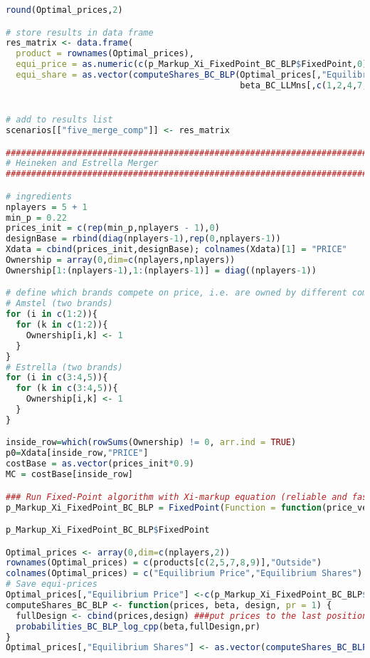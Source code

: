 \begin{lstlisting}[language=R,caption={Computing dynamic Nash equilibria in different competitive scenarios via the fixed point algorithm}, label=lst_nash_esti]
round(Optimal_prices,2)

# store results in data frame
res_matrix <- data.frame(
  product = rownames(Optimal_prices),
  equi_price = as.numeric(c(p_Markup_Xi_FixedPoint_BC_BLP$FixedPoint,0)),
  equi_share = as.vector(computeShares_BC_BLP(Optimal_prices[,"Equilibrium Price"],
                                              beta_BC_LLMns[,c(1,2,4,7,9,10,11)],designBase,pr=1)))


# add to results list
scenarios[["five_merge_comp"]] <- res_matrix

###########################################################################
# Heineken and Estrella Merger
###########################################################################

# ingredients
nplayers = 5 + 1 
min_p = 0.22
prices_init = c(rep(min_p,nplayers - 1),0)
designBase = rbind(diag(nplayers-1),rep(0,nplayers-1))
Xdata = cbind(prices_init,designBase); colnames(Xdata)[1] = "PRICE" 
Ownership = array(0,dim=c(nplayers,nplayers))
Ownership[1:(nplayers-1),1:(nplayers-1)] = diag((nplayers-1))

# define which brands compete on price, i.e. are owned by different companies
# Amstel (two brands)
for (i in c(1:2)){
  for (k in c(1:2)){
    Ownership[i,k] <- 1
  }
}
# Estrella (two brands)
for (i in c(3:4,5)){
  for (k in c(3:4,5)){
    Ownership[i,k] <- 1
  }
}

inside_row=which(rowSums(Ownership) != 0, arr.ind = TRUE)
p0=Xdata[inside_row,"PRICE"]
costBase = as.vector(prices_init*0.9)
MC = costBase[inside_row]

### Run Fixed-Point algorithm with Xi-markup equation (reliable and fast: See Table 3 in paper for comparison)
p_Markup_Xi_FixedPoint_BC_BLP = FixedPoint(Function = function(price_vec) FixedPoint_BLP_Xi(price_vec,MC=MC, ownership=Ownership,Xdata=Xdata,beta_draws=beta_BC_LLMns[,(c(1,2,4,7,9,10,11))],pr=1), Inputs = p0, MaxIter = 10000, ConvergenceMetricThreshold = 1e-10, Method = "Anderson")

p_Markup_Xi_FixedPoint_BC_BLP$FixedPoint

Optimal_prices <- array(0,dim=c(nplayers,2))
rownames(Optimal_prices) = c(products[c(2,5,7,8,9)],"Outside")
colnames(Optimal_prices) = c("Equilibrium Price","Equilibrium Shares")
# Save equi-prices
Optimal_prices[,"Equilibrium Price"] <-c(p_Markup_Xi_FixedPoint_BC_BLP$FixedPoint,0)
computeShares_BC_BLP <- function(prices, beta, design, pr = 1) {
  fullDesign <- cbind(prices,design) ###put prices to the last position here
  probabilities_BC_BLP_log_cpp(beta,fullDesign,pr)
}
Optimal_prices[,"Equilibrium Shares"] <- as.vector(computeShares_BC_BLP(Optimal_prices[,"Equilibrium Price"], beta_BC_LLMns[,c(1,2,4,7,9,10,11)],designBase,pr=1))


\end{lstlisting}
